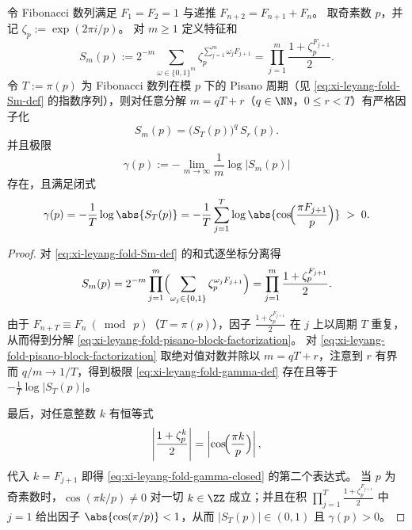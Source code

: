 \begin{theorem}\label{thm:xi-leyang-fold-pisano-factorization-decay}
令 Fibonacci 数列满足 \(F_1=F_2=1\) 与递推 \(F_{n+2}=F_{n+1}+F_n\)。
取奇素数 \(p\)，并记 \(\zeta_p:=\exp(2\pi i/p)\)。
对 \(m\ge 1\) 定义特征和
\begin{equation}\label{eq:xi-leyang-fold-Sm-def}
S_m(p):=
2^{-m}\sum_{\omega\in\{0,1\}^m}\zeta_p^{\sum_{j=1}^{m}\omega_jF_{j+1}}
=
\prod_{j=1}^{m}\frac{1+\zeta_p^{F_{j+1}}}{2}.
\end{equation}
令 \(T:=\pi(p)\) 为 Fibonacci 数列在模 \(p\) 下的 Pisano 周期（见 \eqref{eq:xi-leyang-fold-Sm-def} 的指数序列），则对任意分解 \(m=qT+r\)（\(q\in\NN\)，\(0\le r<T\)）有严格因子化
\begin{equation}\label{eq:xi-leyang-fold-pisano-block-factorization}
S_m(p)=\bigl(S_T(p)\bigr)^q\,S_r(p).
\end{equation}
并且极限
\begin{equation}\label{eq:xi-leyang-fold-gamma-def}
\gamma(p):=-\lim_{m\to\infty}\frac{1}{m}\log|S_m(p)|
\end{equation}
存在，且满足闭式
\begin{equation}\label{eq:xi-leyang-fold-gamma-closed}
\gamma(p)= -\frac{1}{T}\log\abs{S_T(p)}
 = -\frac{1}{T}\sum_{j=1}^{T}\log\abs{\cos\!\Bigl(\frac{\pi F_{j+1}}{p}\Bigr)} \;>\;0.
\end{equation}
\end{theorem}
\begin{proof}
对 \eqref{eq:xi-leyang-fold-Sm-def} 的和式逐坐标分离得
\[
S_m(p)=2^{-m}\prod_{j=1}^{m}\Bigl(\sum_{\omega_j\in\{0,1\}}\zeta_p^{\omega_jF_{j+1}}\Bigr)
=\prod_{j=1}^{m}\frac{1+\zeta_p^{F_{j+1}}}{2}.
\]
由于 \(F_{n+T}\equiv F_n\ (\bmod\ p)\)（\(T=\pi(p)\)），因子 \(\frac{1+\zeta_p^{F_{j+1}}}{2}\) 在 \(j\) 上以周期 \(T\) 重复，从而得到分解 \eqref{eq:xi-leyang-fold-pisano-block-factorization}。
对 \eqref{eq:xi-leyang-fold-pisano-block-factorization} 取绝对值对数并除以 \(m=qT+r\)，注意到 \(r\) 有界而 \(q/m\to 1/T\)，得到极限 \eqref{eq:xi-leyang-fold-gamma-def} 存在且等于 \(-\frac1T\log|S_T(p)|\)。
\par
最后，对任意整数 \(k\) 有恒等式
\[
\left|\frac{1+\zeta_p^{k}}{2}\right|
=\left|\cos\!\Bigl(\frac{\pi k}{p}\Bigr)\right|,
\]
代入 \(k=F_{j+1}\) 即得 \eqref{eq:xi-leyang-fold-gamma-closed} 的第二个表达式。
当 \(p\) 为奇素数时，\(\cos(\pi k/p)\neq 0\) 对一切 \(k\in\ZZ\) 成立；并且在积 \(\prod_{j=1}^{T}\frac{1+\zeta_p^{F_{j+1}}}{2}\) 中 \(j=1\) 给出因子 \(\abs{\cos(\pi/p)}<1\)，从而 \(|S_T(p)|\in(0,1)\) 且 \(\gamma(p)>0\)。
\end{proof}

